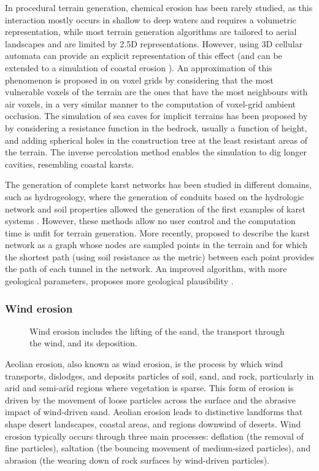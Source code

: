 In procedural terrain generation, chemical erosion has been rarely studied, as this interaction mostly occurs in shallow to deep waters and requires a volumetric representation, while most terrain generation algorithms are tailored to aerial landscapes and are limited by 2.5D representations. However, using 3D cellular automata can provide an explicit representation of this effect \cite{Menshutina2020} (and can be extended to a simulation of coastal erosion \cite{Hawick2014}). An approximation of this phenomenon is proposed in \cite{Beardall2007,Jones2010} on voxel grids by considering that the most vulnerable voxels of the terrain are the ones that have the most neighbours with air voxels, in a very similar manner to the computation of voxel-grid ambient occlusion. The simulation of sea caves for implicit terrains has been proposed by \cite{Paris2018} by considering a resistance function in the bedrock, usually a function of height, and adding spherical holes in the construction tree at the least resistant areas of the terrain. The inverse percolation method enables the simulation to dig longer cavities, resembling coastal karsts.

The generation of complete karst networks has been studied in different domains, such as hydrogeology, where the generation of conduits based on the hydrologic network and soil properties allowed the generation of the first examples of karst systems \cite{Jaquet2004,Pardo2012,Pytel2015}. However, these methods allow no user control and the computation time is unfit for terrain generation. More recently, \cite{Paris2021} proposed to describe the karst network as a graph whose nodes are sampled points in the terrain and for which the shortest path (using soil resistance as the metric) between each point provides the path of each tunnel in the network. An improved algorithm, with more geological parameters, proposes more geological plausibility \cite{Gouy2024}.


\subsubsection{Wind erosion}

\begin{figure}
    \caption{Wind erosion includes the lifting of the sand, the transport through the wind, and its deposition.}
    \label{fig:erosion-wind-erosion}
\end{figure}

Aeolian erosion, also known as wind erosion, is the process by which wind transports, dislodges, and deposits particles of soil, sand, and rock, particularly in arid and semi-arid regions where vegetation is sparse. This form of erosion is driven by the movement of loose particles across the surface and the abrasive impact of wind-driven sand. Aeolian erosion leads to distinctive landforms that shape desert landscapes, coastal areas, and regions downwind of deserts. Wind erosion typically occurs through three main processes: deflation (the removal of fine particles), saltation (the bouncing movement of medium-sized particles), and abrasion (the wearing down of rock surfaces by wind-driven particles).

